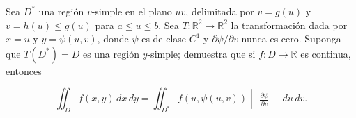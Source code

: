 Sea \( D^* \) una región \( v \)-simple en el plano \( uv \), delimitada por \( v = g(u) \) y \( v = h(u) \leq g(u) \) para \( a \leq u \leq b \). Sea \( T:\mathbb{R}^2 \to \mathbb{R}^2 \) la transformación dada por \( x = u \) y \( y = \psi(u, v) \), donde \( \psi \) es de clase \( C^{1} \) y \( \partial \psi / \partial v \) nunca es cero. Suponga que \( T(D^*) = D \) es una región \( y \)-simple; demuestra que si \( f: D \to \mathbb{R} \) es continua, entonces

\[
\iint_D f(x, y) \, dx \, dy = \iint_{D^*} f(u, \psi(u, v)) \begin{vmatrix}
    \frac{\partial \psi}{\partial v}
\end{vmatrix} \, du \, dv.
\]
